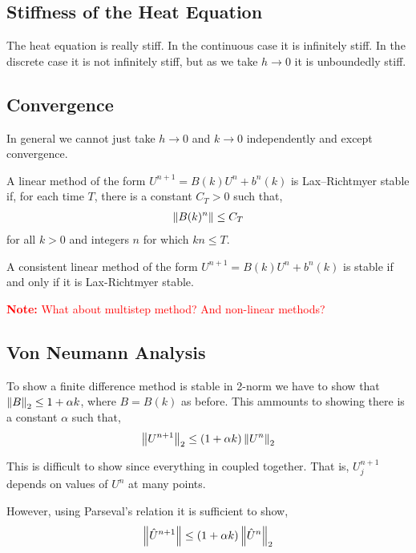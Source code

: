 \documentclass[12pt]{article}
\newcommand{\note}[1]{\textcolor{red}{\textbf{Note:} #1}}
\begin{document}
\subsection{Stiffness of the Heat Equation}
The heat equation is really stiff. In the continuous case it is infinitely stiff. In the discrete case it is not infinitely stiff, but as we take \( h\to0 \) it is unboundedly stiff. 

\subsection{Convergence}
In general we cannot just take \( h\to 0 \) and \( k\to 0 \) independently and except convergence. 

\begin{definition}
    A linear method of the form \( U^{n+1} = B(k) U^n + b^n(k) \) is Lax--Richtmyer stable if, for each time \( T \), there is a constant \( C_T > 0 \) such that,
    \begin{align*}
        \left\lVert B(k)^n\right\rVert \leq C_T
    \end{align*}
for all \( k > 0 \) and integers \( n \) for which \( kn \leq T \).
\end{definition}

\begin{theorem}
    A consistent linear method of the form \( U^{n+1} = B(k)U^n + b^n(k) \) is stable if and only if it is Lax-Richtmyer stable.
\end{theorem}

\note{What about multistep method? And non-linear methods?}

\subsection{Von Neumann Analysis}
To show a finite difference method is stable in 2-norm we have to show that \( \left\lVert B\right\rVert_2 \leq 1+ \alpha k \), where \( B = B(k) \) as before. This ammounts to showing there is a constant \( \alpha \) such that,
\begin{align*}
    \left\lVert U^{n+1}\right\rVert_2 \leq (1+\alpha k) \left\lVert U^n\right\rVert_2
\end{align*}

This is difficult to show since everything in coupled together. That is, \( U_j^{n+1} \) depends on values of \( U^n \) at many points.

However, using Parseval's relation it is sufficient to show,
\begin{align*}
    \left\lVert\hat{U}^{n+1}\right\rVert \leq (1+\alpha k) \left\lVert\hat{U}^n\right\rVert_2
\end{align*}
\end{document}
